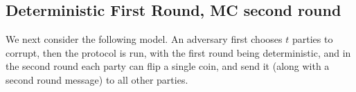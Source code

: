 \begin{comment}
\subsubsection{Deterministic First Round, MC second round}

We next consider the case of a $5n$-party $2n$-resilient BA, where execution is deterministic in the first round, and in the second round all parties have one public coin. Termination is then decided by an honest party based on its entire view. We, again, claim that in this model honest parties cannot halt with significant probability in less than three rounds of communication. Our main theorem is as follows:

\begin{theorem}\label{thm4}
	Let $\Pi$ be a $5n$-party $2n$-resilient Byzantine agreement where the first round of communication in $\Pi$ is deterministic, and in the second round each party has a single coin which it has to distribute. Then other than with negligible probability $\Pi$'s expected round complexity is at least three.
\end{theorem}

We prove \cref{thm4} by considering the following claim, of which the theorem naturally follows.

\begin{lemma}\label{lemma4}
	Let $\Pi$ be a $5$-party $2$-resilient $\epsilon$-sound Byzantine agreement where the first round of communication in $\Pi$ is deterministic, and in the second round each party has a single coin which it has to distribute, and assume that for $\Pi$, for every adversary controlling at most $2$ parties and for every input vector it holds that
	\[
	\Pr[\text{All honest parties halt after at most two rounds of communication}] \geq \delta.
	\]
	Then $\delta \leq \varepsilon$.
\end{lemma}

To prove the lemma we consider the scenario chain previously defined
\end{comment}

\subsection{Deterministic First Round, MC second round}
We next consider the following model. An adversary first chooses $t$ parties to corrupt, then the protocol is run, with the first round being deterministic, and in the second round each party can flip a single coin, and send it (along with a second round message) to all other parties.

